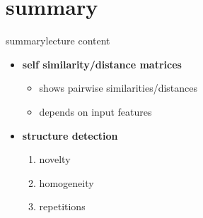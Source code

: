     \section{summary}
        \begin{frame}{summary}{lecture content}
            \begin{itemize}
                \item   \textbf{self similarity/distance matrices}
                    \begin{itemize}
                        \item   shows pairwise similarities/distances
                        \item   depends on input features
                    \end{itemize}
                \bigskip
                \item   \textbf{structure detection}
                    \begin{enumerate}
                        \item   novelty
                        \item   homogeneity
                        \item   repetitions
                    \end{enumerate}
            \end{itemize}
        \end{frame}

